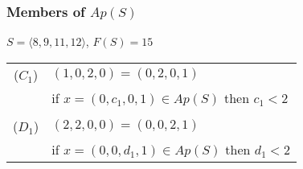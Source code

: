 \documentclass{beamer}
\begin{document}

\begin{frame}
\begin{center}
\frametitle{Members of $Ap(S)$}

$S = \langle 8, 9, 11, 12 \rangle$, $F(S) = 15$

\begin{center}
\begin{tabular}{cl}
($C_1$) & $\left(1, 0, 2, 0\right) = \left(0, 2, 0, 1\right)$\\
 & if $x = \left(0, c_1, 0, 1\right) \in Ap(S)$ then $c_1 < 2$\\
 &\\
($D_1$) & $\left(2, 2, 0, 0\right) = \left(0, 0, 2, 1\right)$\\
 & if $x = \left(0, 0, d_1, 1\right) \in Ap(S)$ then $d_1 < 2$\\
\end{tabular}
\end{center}

~\\


\end{center}
\end{frame}

\end{document}
